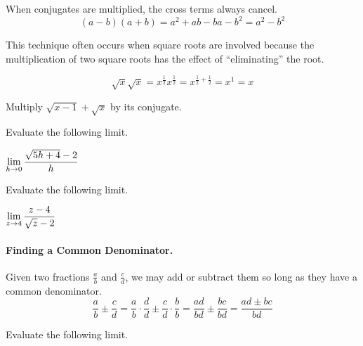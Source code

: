 \documentclass[12pt]{article}
\begin{document}
\vspace{5mm}


\vspace{5mm}

When conjugates are multiplied, the cross terms always cancel.
$$(a-b)(a+b)=a^2+ab-ba-b^2=a^2-b^2$$

\vspace{5mm}

This technique often occurs when square roots are involved because the multiplication of two square roots has the effect of ``eliminating'' the root.

$$\sqrt{x}\sqrt{x}=x^{\frac{1}{2}}x^{\frac{1}{2}}=x^{\frac{1}{2}+\frac{1}{2}}=x^1=x$$

\vspace{5mm}

\Example Multiply $\sqrt{x-1}+\sqrt{x}$ by its conjugate.

\vspace{20mm}

\Example Evaluate the following limit.

\vspace{5mm}

\hspace{10mm} $\displaystyle\lim_{h\to 0}\frac{\sqrt{5h+4}-2}{h}$

\vspace{33mm}

\Example Evaluate the following limit.

\vspace{5mm}

\hspace{10mm} $\displaystyle\lim_{z\to 4}\frac{z-4}{\sqrt{z}-2}$

\vspace{33mm}

\newpage 

\paragraph{Finding a Common Denominator.} Given two fractions $\frac{a}{b}$ and $\frac{c}{d}$, we may add or subtract them so long as they have a common denominator.
$$\frac{a}{b}\pm\frac{c}{d}=\frac{a}{b}\cdot\frac{d}{d}\pm\frac{c}{d}\cdot\frac{b}{b}=\frac{ad}{bd}\pm\frac{bc}{bd}=\frac{ad\pm bc}{bd}$$

\Example Evaluate the following limit.
\end{document}
